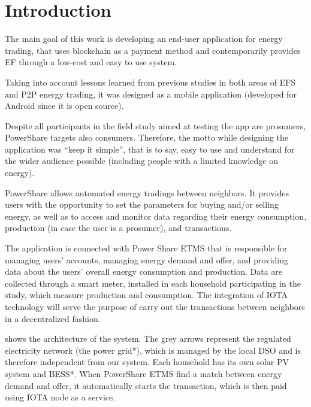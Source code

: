 \cleardoublepage
\label{chap:implement}
\section{Introduction} 

The main goal of this work is developing an end-user application for energy trading, that uses blockchain as a payment method and contemporarily provides EF through a low-cost and easy to use system.


Taking into account lessons learned from previous studies in both areas of \ac{EFS} and \ac{P2P} energy trading, it was designed as a mobile application (developed for Android since it is open source).



Despite all participants in the field study aimed at testing the app are prosumers, PowerShare targets also consumers. Therefore, the motto while designing the application was “keep it simple”, that is to say, easy to use and understand for the wider audience possible (including people with a limited knowledge on energy).



PowerShare allows automated energy tradings between neighbors. It provides users with the opportunity to set the parameters for buying and/or selling energy, as well as to access and monitor data regarding their energy consumption, production (in case the user is a prosumer), and transactions.



The application is connected with Power Share \ac{ETMS} that is responsible for managing users’ accounts, managing energy demand and offer, and providing data about the users’ overall energy consumption and production. Data are collected through a smart meter, installed in each household participating in the study, which measure  production and consumption. The integration of IOTA technology will serve the purpose of carry out the transactions between neighbors in a decentralized fashion.


 shows the architecture of the system. The grey arrows represent the regulated electricity network (the power grid*), which is managed by the local \ac{DSO} and is therefore independent from our system. Each household has its own solar PV system and BESS*. When PowerShare \ac{ETMS} find a match between energy demand and offer, it automatically starts the transaction, which is then paid using IOTA node as a service.  

